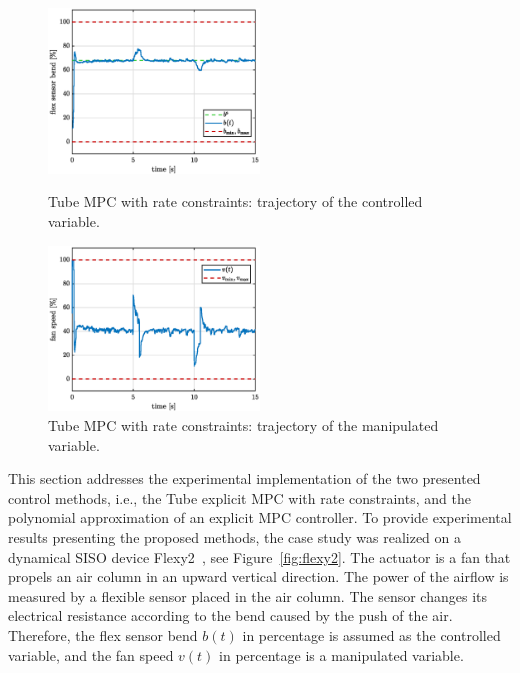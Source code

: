 \documentclass[letterpaper, 10 pt, conference]{ieeeconf}
\begin{document}
	
	\begin{figure}[hbp!]
		\begin{center}
			\includegraphics[width=0.5\textwidth]{images/deltaU_b_new.eps}
			\caption{Tube MPC with rate constraints: trajectory of the controlled variable.}
			\label{fig:deltaU_y}
		\end{center}
		\begin{center}
			\includegraphics[width=0.5\textwidth]{images/deltaU_v_new.eps}
			\caption{Tube MPC with rate constraints: trajectory of the manipulated variable.}
			\label{fig:deltaU_u}
		\end{center}
	\end{figure}
	
	This section addresses the experimental implementation of the two presented control methods, i.e., the Tube explicit MPC with rate constraints, and the polynomial approximation of an explicit MPC controller. To provide experimental results presenting the proposed methods, the case study was realized on a dynamical SISO device Flexy2~\cite{flexy2}, see Figure~\ref{fig:flexy2}. The actuator is a fan that propels an air column in an upward vertical direction. The power of the airflow is measured
	by a flexible sensor placed in the air column. The sensor changes its electrical resistance according to the bend caused by the push of the air. Therefore, the flex sensor bend $b(t)$ in percentage is assumed as the controlled variable, and the fan speed $v(t)$ in percentage is a manipulated variable.
	
\end{document}
